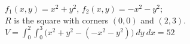 {$f_1(x,y) = x^2+y^2$, $f_2(x,y) = -x^2-y^2$;\\
 $R$ is the square with corners $(0,0)$ and $(2,3)$.
}
{$V = \int_{0}^2\int_{0}^3 \big(x^2+y^2-(-x^2-y^2)\big)\ dy\ dx = 52$
}
